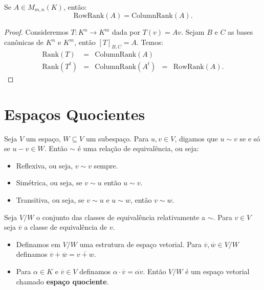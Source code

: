 \documentclass[11pt,twoside,a4paper]{book}
\begin{document}
\begin{corolario}
Se $A\in M_{m,n}(K)$, então:
\[
\mathrm{Row Rank}(A)=\mathrm{Column Rank}(A).
\]
\end{corolario}
\begin{proof}
Consideremos $T:K^n\rightarrow K^m$ dada por $T(v)=Av$. Sejam $B$ e $C$ as bases canônicas de $K^n$ e $K^m$, então $[T]_{B,C}=A$. Temos:
\[
\begin{array}{ccccc}
\mathrm{Rank}(T)&=&\mathrm{Column Rank}(A)&&\\
\mathrm{Rank}(T^t)&=&\mathrm{Column Rank}(A^t)&=&\mathrm{Row Rank}(A).
\end{array}
\]

\noindent
\end{proof}

\section{Espaços Quocientes}

\begin{definicao}
Seja $V$ um espaço, $W\subseteq V$ um subespaço. Para $u,v\in V$, digamos que $u\sim v$ se e só se $u-v\in W$. Então $\sim$ é uma relação de equivalência, ou seja:
\begin{itemize}
\item Reflexiva, ou seja, $v\sim v$ sempre.
\item Simétrica, ou seja, se $v\sim u$ então $u\sim v$.
\item Transitiva, ou seja, se $v\sim u$ e $u\sim w$, então $v\sim w$.
\end{itemize}
Seja $V/W$ o conjunto das classes de equivalência relativamente a $\sim$. Para $v\in V$ seja $\overline{v}$ a classe de equivalência de $v$.
\begin{itemize}
\item Definamos em $V/W$ uma estrutura de espaço vetorial. Para $\overline{v},\overline{w}\in V/W$ definamos $\overline{v}+\overline{w}=\overline{v+w}$.
\item Para $\alpha\in K$ e $\overline{v}\in V$ definamos $\alpha\cdot\overline{v}=\overline{\alpha v}$. Então $V/W$ é um espaço vetorial chamado \textbf{espaço quociente}.
\end{itemize}
\end{definicao}
\end{document}
